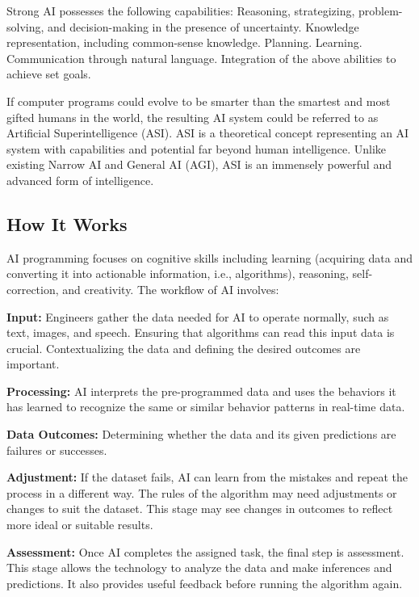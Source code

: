 \documentclass[
]{book}
\begin{document}
Strong AI possesses the following capabilities:
Reasoning, strategizing, problem-solving, and decision-making in the presence of uncertainty.
Knowledge representation, including common-sense knowledge.
Planning.
Learning.
Communication through natural language.
Integration of the above abilities to achieve set goals.

If computer programs could evolve to be smarter than the smartest and most gifted humans in the world, the resulting AI system could be referred to as Artificial Superintelligence (ASI). ASI is a theoretical concept representing an AI system with capabilities and potential far beyond human intelligence. Unlike existing Narrow AI and General AI (AGI), ASI is an immensely powerful and advanced form of intelligence.

\hypertarget{how-it-works}{%
\subsection{How It Works}\label{how-it-works}}

AI programming focuses on cognitive skills including learning (acquiring data and converting it into actionable information, i.e., algorithms), reasoning, self-correction, and creativity. The workflow of AI involves:

\textbf{Input:}
Engineers gather the data needed for AI to operate normally, such as text, images, and speech. Ensuring that algorithms can read this input data is crucial. Contextualizing the data and defining the desired outcomes are important.

\textbf{Processing:}
AI interprets the pre-programmed data and uses the behaviors it has learned to recognize the same or similar behavior patterns in real-time data.

\textbf{Data Outcomes:}
Determining whether the data and its given predictions are failures or successes.

\textbf{Adjustment:}
If the dataset fails, AI can learn from the mistakes and repeat the process in a different way. The rules of the algorithm may need adjustments or changes to suit the dataset. This stage may see changes in outcomes to reflect more ideal or suitable results.

\textbf{Assessment:}
Once AI completes the assigned task, the final step is assessment. This stage allows the technology to analyze the data and make inferences and predictions. It also provides useful feedback before running the algorithm again.
\end{document}
